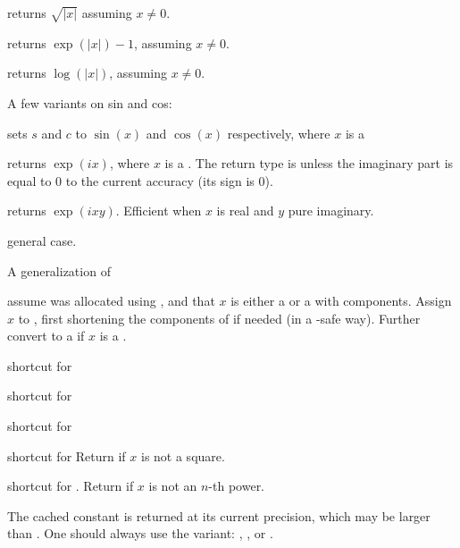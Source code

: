  returns $\sqrt{|x|}$ assuming $x\neq 0$.

 returns $\exp(|x|) - 1$, assuming $x \neq 0$.

 returns $\log(|x|)$, assuming $x \neq 0$.

\noindent A few variants on sin and cos:

 sets $s$ and $c$ to
$\sin(x)$ and $\cos(x)$ respectively, where $x$ is a 

 returns $\exp(ix)$, where $x$ is a .
The return type is  unless the imaginary part is equal to $0$
to the current accuracy (its sign is $0$).

 returns $\exp(ixy)$. Efficient
when $x$ is real and $y$ pure imaginary.

 general case.

\noindent A generalization of 

 assume  was allocated using
, and that $x$ is either a  or a 
with  components. Assign $x$ to , first shortening
the components of  if needed (in a -safe way). Further
convert  to a  if $x$ is a .


 shortcut for 

 shortcut for 

 shortcut for 

 shortcut for 
Return  if $x$ is not a square.

 shortcut for . Return  if $x$ is not an $n$-th power.


The cached constant is returned at its current precision, which may be larger
than . One should always use the  variant:
, , or .

